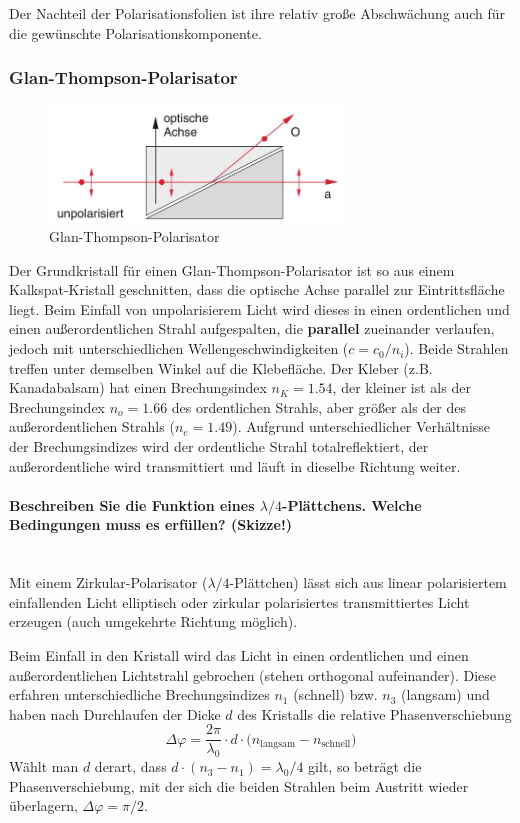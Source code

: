 \documentclass[a4paper, 11pt, ngerman, parskip=half-]{scrartcl}
\newcommand{\myparagraph}[1]{\paragraph{#1}\mbox{}\\}
\begin{document}
Der Nachteil der Polarisationsfolien ist ihre relativ große Abschwächung auch für die gewünschte Polarisationskomponente.
%
\subsubsection*{Glan-Thompson-Polarisator}
%
\begin{figure}[H]
    \centering
    \begin{samepage}
        \includegraphics[width=0.7\textwidth]{image/15/Glan-Thompson.jpg}
        \caption{Glan-Thompson-Polarisator}
        \label{fig:Glan-Thompson-Polarisator}
    \end{samepage}
\end{figure}
%
Der Grundkristall für einen Glan-Thompson-Polarisator ist so aus einem Kalkspat-Kristall geschnitten, dass die optische Achse parallel zur Eintrittsfläche liegt. Beim Einfall von unpolarisierem Licht wird dieses in einen ordentlichen und einen außerordentlichen Strahl aufgespalten, die \textbf{parallel} zueinander verlaufen, jedoch mit unterschiedlichen Wellengeschwindigkeiten ($c = c_0 / n_i$). Beide Strahlen treffen unter demselben Winkel auf die Klebefläche.
Der Kleber (z.B. Kanadabalsam) hat einen Brechungsindex $n_K = \num{1.54}$, der kleiner ist als der Brechungsindex $n_o = \num{1.66}$ des
ordentlichen Strahls, aber größer als der des außerordentlichen Strahls ($n_e = \num{1.49}$). Aufgrund unterschiedlicher Verhältnisse der Brechungsindizes wird der ordentliche Strahl totalreflektiert, der außerordentliche wird transmittiert und läuft in dieselbe Richtung weiter.


\myparagraph{Beschreiben Sie die Funktion eines $\lambda/4$-Plättchens. Welche Bedingungen muss es erfüllen? (Skizze!)}
%
Mit einem Zirkular-Polarisator ($\lambda/4$-Plättchen) lässt sich aus linear polarisiertem einfallenden Licht elliptisch oder zirkular polarisiertes transmittiertes Licht erzeugen (auch umgekehrte Richtung möglich).

Beim Einfall in den Kristall wird das Licht in einen ordentlichen und einen außerordentlichen Lichtstrahl gebrochen (stehen orthogonal aufeinander). Diese erfahren unterschiedliche Brechungsindizes $n_1$ (schnell) bzw. $n_3$ (langsam) und haben nach Durchlaufen der Dicke $d$ des Kristalls die relative Phasenverschiebung
%
\[\Delta \varphi = \frac{2\pi}{\lambda_0} \cdot d \cdot \bigg( n_{\text{langsam}} - n_{\text{schnell}} \bigg) \]
%
Wählt man $d$ derart, dass $d \cdot (n_3 - n_1) = \lambda_0/4$ gilt, so beträgt die Phasenverschiebung, mit der sich die beiden Strahlen beim Austritt wieder überlagern, $\Delta \varphi = \pi/2$.
\end{document}
